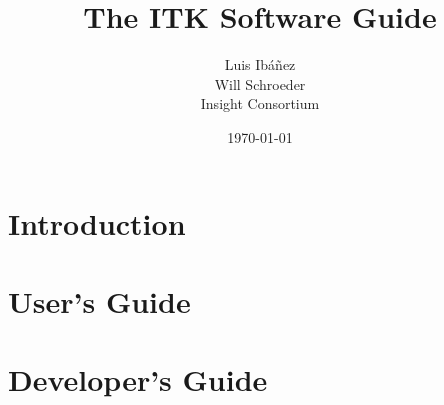 \documentclass{InsightManual}
\title{The ITK Software Guide}
\author{Luis Ib\'{a}\~{n}ez\\Will Schroeder\\Insight Consortium}
\date{\today}
\begin{document}
\maketitle

%


\tableofcontents





\part{Introduction}
%

%


\part{User's Guide}
%
%

%
%

%



\part{Developer's Guide}
%
%
%
%
%








\end{document}

